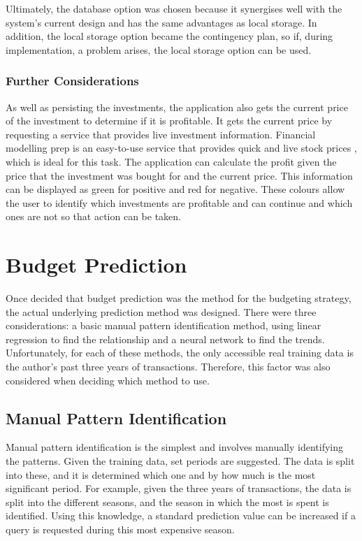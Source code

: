 Ultimately, the database option was chosen because it synergises well with the system's current design and has the same advantages as local storage. In addition, the local storage option became the contingency plan, so if, during implementation, a problem arises, the local storage option can be used.

\subsubsection{Further Considerations}
As well as persisting the investments, the application also gets the current price of the investment to determine if it is profitable. It gets the current price by requesting a service that provides live investment information. Financial modelling prep is an easy-to-use service that provides quick and live stock prices \cite{FMP}, which is ideal for this task. The application can calculate the profit given the price that the investment was bought for and the current price. This information can be displayed as green for positive and red for negative. These colours allow the user to identify which investments are profitable and can continue and which ones are not so that action can be taken.

\section{Budget Prediction}
\label{sec:BudgetPrediction}
Once decided that budget prediction was the method for the budgeting strategy, the actual underlying prediction method was designed. There were three considerations: a basic manual pattern identification method, using linear regression to find the relationship and a neural network to find the trends. Unfortunately, for each of these methods, the only accessible real training data is the author's past three years of transactions. Therefore, this factor was also considered when deciding which method to use.

\subsection{Manual Pattern Identification}
Manual pattern identification is the simplest and involves manually identifying the patterns. Given the training data, set periods are suggested. The data is split into these, and it is determined which one and by how much is the most significant period. For example, given the three years of transactions, the data is split into the different seasons, and the season in which the most is spent is identified. Using this knowledge, a standard prediction value can be increased if a query is requested during this most expensive season.


